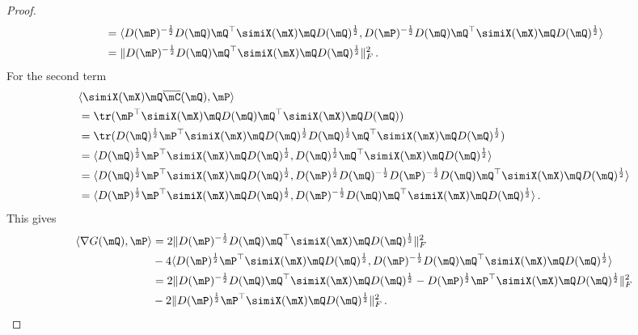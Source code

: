 \begin{proof}
\begin{equation}
\begin{split}
			&= \langle D(\mP)^{-\frac{1}{2}} D(\mQ) \mQ^\top \simiX(\mX) \mQ D(\mQ)^{\frac{1}{2}}, D(\mP)^{-\frac{1}{2}} D(\mQ) \mQ^\top \simiX(\mX) \mQ D(\mQ)^{\frac{1}{2}} \rangle \\
			&= \|D(\mP)^{-\frac{1}{2}} D(\mQ) \mQ^\top \simiX(\mX) \mQ D(\mQ)^{\frac{1}{2}}\|_F^2\,.
		\end{split}
	\end{equation}
	For the second term 
	\begin{equation}
		\begin{split}
			&\langle \simiX(\mX) \mQ \overline{\mC}(\mQ),\mP \rangle \\
			 &=  \tr(\mP^\top\simiX(\mX) \mQ  D(\mQ)\mQ^\top \simiX(\mX) \mQ D(\mQ)) \\
			&= \tr(D(\mQ)^{\frac{1}{2}}\mP^\top\simiX(\mX) \mQ  D(\mQ)^{\frac{1}{2}}D(\mQ)^{\frac{1}{2}}\mQ^\top \simiX(\mX) \mQ D(\mQ)^{\frac{1}{2}}) \\
			&= \langle D(\mQ)^{\frac{1}{2}}\mP^\top\simiX(\mX) \mQ  D(\mQ)^{\frac{1}{2}},  D(\mQ)^{\frac{1}{2}}\mQ^\top \simiX(\mX) \mQ D(\mQ)^{\frac{1}{2}} \rangle \\
			&=\langle D(\mQ)^{\frac{1}{2}}\mP^\top\simiX(\mX) \mQ  D(\mQ)^{\frac{1}{2}},  D(\mP)^{\frac{1}{2}} D(\mQ)^{-\frac{1}{2}} D(\mP)^{-\frac{1}{2}} D(\mQ)\mQ^\top \simiX(\mX) \mQ D(\mQ)^{\frac{1}{2}} \rangle \\
			&=\langle  D(\mP)^{\frac{1}{2}} \mP^\top\simiX(\mX) \mQ  D(\mQ)^{\frac{1}{2}},  D(\mP)^{-\frac{1}{2}} D(\mQ)\mQ^\top \simiX(\mX) \mQ D(\mQ)^{\frac{1}{2}} \rangle\,.
		\end{split}
	\end{equation}
	This gives
	\begin{equation}
		\begin{split}
			\langle \nabla G(\mQ), \mP \rangle &=  2 \|D(\mP)^{-\frac{1}{2}} D(\mQ) \mQ^\top \simiX(\mX) \mQ D(\mQ)^{\frac{1}{2}}\|_F^2 \\
			&- 4\langle  D(\mP)^{\frac{1}{2}} \mP^\top\simiX(\mX) \mQ  D(\mQ)^{\frac{1}{2}},  D(\mP)^{-\frac{1}{2}} D(\mQ)\mQ^\top \simiX(\mX) \mQ D(\mQ)^{\frac{1}{2}} \rangle  \\
			&=2 \|D(\mP)^{-\frac{1}{2}} D(\mQ)\mQ^\top \simiX(\mX) \mQ D(\mQ)^{\frac{1}{2}}-D(\mP)^{\frac{1}{2}} \mP^\top\simiX(\mX) \mQ  D(\mQ)^{\frac{1}{2}}\|_F^2 \\
			&-2\|D(\mP)^{\frac{1}{2}} \mP^\top\simiX(\mX) \mQ  D(\mQ)^{\frac{1}{2}}\|_F^2 \,. \\
		\end{split}
	\end{equation}

\end{proof}
